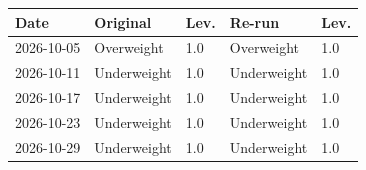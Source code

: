 \begin{tabular}{lllll}
\toprule
Date & Original & Lev. & Re-run & Lev. \\
\midrule
2026-10-05 & Overweight & 1.0 & Overweight & 1.0 \\
2026-10-11 & Underweight & 1.0 & Underweight & 1.0 \\
2026-10-17 & Underweight & 1.0 & Underweight & 1.0 \\
2026-10-23 & Underweight & 1.0 & Underweight & 1.0 \\
2026-10-29 & Underweight & 1.0 & Underweight & 1.0 \\
\bottomrule
\end{tabular}